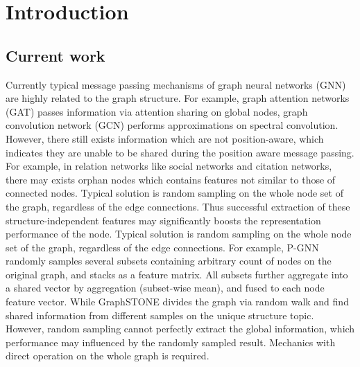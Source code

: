 \documentclass[onecolumn, conference]{IEEEtran}
\begin{document}


\section{Introduction}
\subsection{Current work}
Currently typical message passing mechanisms of graph neural networks (GNN) are highly related to the graph structure. For example, graph attention networks (GAT)\cite{gat} passes information via attention sharing on global nodes, graph convolution network (GCN)\cite{gcn} performs approximations on spectral convolution. However, there still exists information which are not position-aware, which indicates they are unable to be shared during the position aware message passing. For example, in relation networks like social networks and citation networks, there may exists orphan nodes which contains features not similar to those of connected nodes. Typical solution is random sampling on the whole node set of the graph, regardless of the edge connections. Thus successful extraction of these structure-independent features may significantly boosts the representation performance of the node. Typical solution is random sampling on the whole node set of the graph, regardless of the edge connections. For example, P-GNN\cite{b1} randomly samples several subsets containing arbitrary count of nodes on the original graph, and stacks as a  feature matrix. All subsets further aggregate into a shared vector by aggregation (subset-wise mean), and fused to each node feature vector. While GraphSTONE\cite{b2} divides the graph via random walk and find shared information from different samples on the unique structure topic. However, random sampling cannot perfectly extract the global information, which performance may influenced by the randomly sampled result. Mechanics with direct operation on the whole graph is required. 
\end{document}
